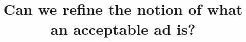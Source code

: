 \documentclass{sig-alternate-05-2015}
\begin{document}

%


\title{Can we refine the notion of what an acceptable ad is?}
\subtitle{}
%
%
%
%
%
\end{document}

